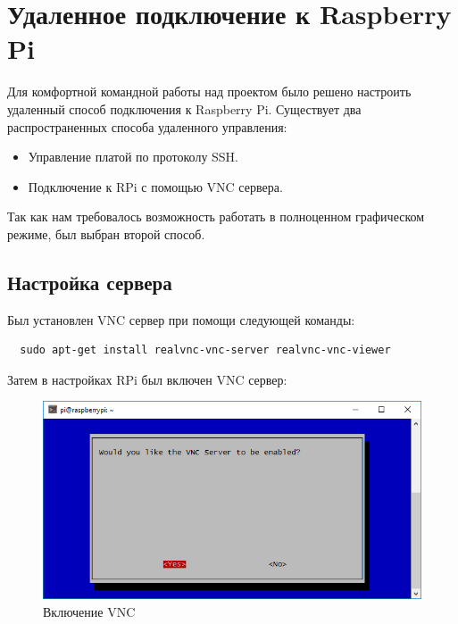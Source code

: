\documentclass[a4paper,11pt]{article}
\begin{document}
\section{Удаленное подключение к Raspberry Pi}
\noindent Для комфортной командной работы над проектом было решено настроить удаленный способ подключения к Raspberry Pi. Существует два распространенных способа удаленного управления:
\begin{itemize}
  \item Управление платой по протоколу SSH.
  \item Подключение к RPi с помощью VNC сервера.
\end{itemize}
\noindent Так как нам требовалось возможность работать в полноценном графическом режиме, был выбран второй способ.

\subsection{Настройка сервера}
Был установлен VNC сервер при помощи следующей команды:
\begin{verbatim}
  sudo apt-get install realvnc-vnc-server realvnc-vnc-viewer
\end{verbatim}
Затем в настройках RPi был включен VNC сервер:
\begin{figure}[h!]
  \begin{center}
    \includegraphics[scale=0.6]{images/image5.png}
  \caption{Включение VNC}
  \end{center}
\end{figure}
\end{document}

